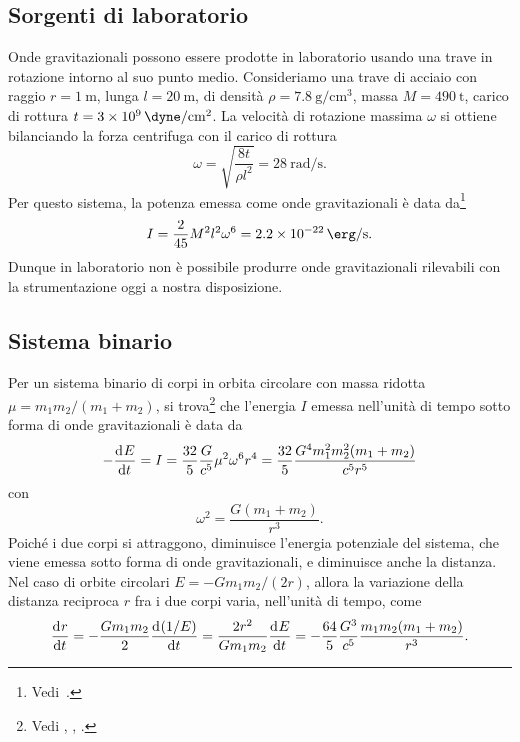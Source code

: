 \subsection{Sorgenti di laboratorio}
\label{sec:sorgenti-laboratorio}

Onde gravitazionali possono essere prodotte in laboratorio usando una trave in
rotazione intorno al suo punto medio.  Consideriamo una trave di acciaio con
raggio $r = \SI{1}{\metre}$, lunga $l = \SI{20}{\metre}$, di densità
$\rho = \SI{7.8}{\gram\per\centi\metre\cubed}$, massa $M = \SI{490}{\tonne}$,
carico di rottura $t = \SI{3e9}{\dyne\per\centi\metre\squared}$.  La velocità di
rotazione massima $\omega$ si ottiene bilanciando la forza centrifuga con il
carico di rottura
\begin{equation}
  \omega = \sqrt{\frac{8t}{\rho l^{2}}} = \SI{28}{\radian\per\second}.
\end{equation}
Per questo sistema, la potenza emessa come onde gravitazionali è data
da\footnote{Vedi~\textcite[980]{misner:gravitation}.}
\begin{equation}
  I = \frac{2}{45} M^{2} l^{2} \omega^{6} = \SI{2.2e-22}{\erg\per\second}.
\end{equation}
Dunque in laboratorio non è possibile produrre onde gravitazionali rilevabili
con la strumentazione oggi a nostra disposizione.

\subsection{Sistema binario}
\label{sec:sistema-binario}

Per un sistema binario di corpi in orbita circolare con massa ridotta
$\mu = m_{1}m_{2}/(m_{1} + m_{2})$, si
trova\footnote{Vedi \textcite[461]{landau:campi},
  \textcite[986]{misner:gravitation}, \textcite[476]{shapiro:black-holes}.}
che l'energia $I$ emessa nell'unità di tempo sotto forma di onde gravitazionali
è data da
\begin{equation}
  \label{eq:potenza-onde-sistema-binario}
  -\frac{{\mathop{}\!\mathrm{d}^{}}E}{\mathop{}\!\mathrm{d} {t}^{}} = I = \frac{32}{5} \frac{G}{c^{5}} \mu^{2} \omega^{6} r^{4} =
  \frac{32}{5} \frac{G^{4} m_{1}^{2} m_{2}^{2} (m_{1} + m_{2})}{c^{5}r^{5}}
\end{equation}
con
\begin{equation}
  \omega^{2} = \frac{G(m_{1} + m_{2})}{r^{3}}.
\end{equation}
Poiché i due corpi si attraggono, diminuisce l'energia potenziale del sistema,
che viene emessa sotto forma di onde gravitazionali, e diminuisce anche la
distanza.  Nel caso di orbite circolari $E = -Gm_{1}m_{2}/(2r)$, allora la
variazione della distanza reciproca $r$ fra i due corpi varia, nell'unità di
tempo, come
\begin{equation}
  \frac{{\mathop{}\!\mathrm{d}^{}}r}{\mathop{}\!\mathrm{d} {t}^{}} = -\frac{Gm_{1}m_{2}}{2} \frac{{\mathop{}\!\mathrm{d}^{}}(1/E)}{\mathop{}\!\mathrm{d} {t}^{}} =
  \frac{2r^{2}}{Gm_{1}m_{2}} \frac{{\mathop{}\!\mathrm{d}^{}}E}{\mathop{}\!\mathrm{d} {t}^{}} = -\frac{64}{5}\frac{G^{3}}{c^{5}}
  \frac{m_{1}m_{2}(m_{1} + m_{2})}{r^{3}}.
\end{equation}

